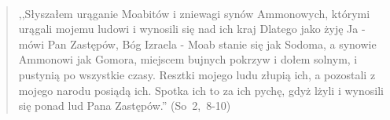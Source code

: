 \documentclass[10pt,a4paper,oneside]{article}
\begin{document}
\paragraph{}
\begin{quote}
,,Słyszałem urąganie Moabitów i zniewagi synów Ammonowych, którymi urągali mojemu ludowi i wynosili się nad ich kraj Dlatego jako żyję Ja - mówi Pan Zastępów, Bóg Izraela - Moab stanie się jak Sodoma, a synowie Ammonowi jak Gomora, miejscem bujnych pokrzyw i dołem solnym, i pustynią po wszystkie czasy. Resztki mojego ludu złupią ich, a pozostali z mojego narodu posiądą ich. Spotka ich to za ich pychę, gdyż lżyli i wynosili się ponad lud Pana Zastępów.'' \mbox{(So 2, 8-10)}
\end{quote}
\end{document}
